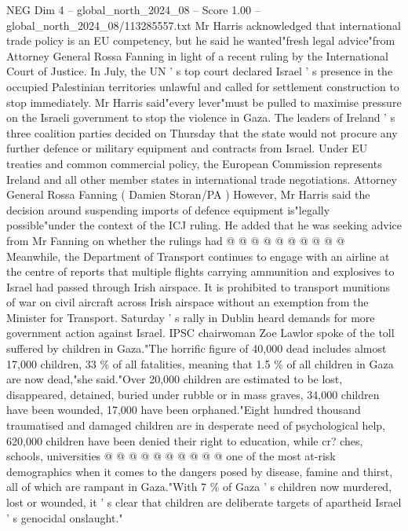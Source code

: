 \begin{textsample}{NEG Dim 4 – global\_north\_2024\_08 – Score 1.00 – global\_north\_2024\_08/113285557.txt}  \label{ex:f4_neg_299}
Mr Harris acknowledged that international trade policy is an EU competency, but he said he wanted"fresh legal advice"from Attorney General Rossa Fanning in light of a recent ruling by the International Court of Justice.
In July, the UN ' s top court declared Israel ' s presence in the occupied Palestinian territories unlawful and called for settlement construction to stop immediately.
Mr Harris said"every lever"must be pulled to maximise pressure on the Israeli government to stop the violence in Gaza.
The leaders of Ireland ' s three coalition parties decided on Thursday that the state would not procure any further defence or military equipment and contracts from Israel.
Under EU treaties and common commercial policy, the European Commission represents Ireland and all other member states in international trade negotiations.
Attorney General Rossa Fanning ( Damien Storan/PA ) However, Mr Harris said the decision around suspending imports of defence equipment is"legally possible"under the context of the ICJ ruling.
He added that he was seeking advice from Mr Fanning on whether the rulings had @ @ @ @ @ @ @ @ @ @ Meanwhile, the Department of Transport continues to engage with an airline at the centre of reports that multiple flights carrying ammunition and explosives to Israel had passed through Irish airspace.
It is prohibited to transport munitions of war on civil aircraft across Irish airspace without an exemption from the Minister for Transport.
Saturday ' s rally in Dublin heard demands for more government action against Israel.
IPSC chairwoman Zoe Lawlor spoke of the toll suffered by children in Gaza."The horrific figure of 40,000 dead includes almost 17,000 children, 33 \% of all fatalities, meaning that 1.5 \% of all children in Gaza are now dead,"she said."Over 20,000 children are estimated to be lost, disappeared, detained, buried under rubble or in mass graves, 34,000 children have been wounded, 17,000 have been orphaned."Eight hundred thousand traumatised and damaged children are in desperate need of psychological help, 620,000 children have been denied their right to education, while cr? ches, schools, universities @ @ @ @ @ @ @ @ @ @ one of the most at-risk demographics when it comes to the dangers posed by disease, famine and thirst, all of which are rampant in Gaza."With 7 \% of Gaza ' s children now murdered, lost or wounded, it ' s clear that children are deliberate targets of apartheid Israel ' s genocidal onslaught."

\end{textsample}
